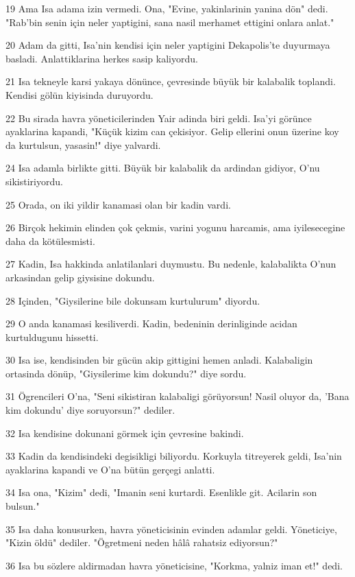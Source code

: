 \par 19 Ama Isa adama izin vermedi. Ona, "Evine, yakinlarinin yanina dön" dedi. "Rab'bin senin için neler yaptigini, sana nasil merhamet ettigini onlara anlat."
\par 20 Adam da gitti, Isa'nin kendisi için neler yaptigini Dekapolis'te duyurmaya basladi. Anlattiklarina herkes sasip kaliyordu.
\par 21 Isa tekneyle karsi yakaya dönünce, çevresinde büyük bir kalabalik toplandi. Kendisi gölün kiyisinda duruyordu.
\par 22 Bu sirada havra yöneticilerinden Yair adinda biri geldi. Isa'yi görünce ayaklarina kapandi, "Küçük kizim can çekisiyor. Gelip ellerini onun üzerine koy da kurtulsun, yasasin!" diye yalvardi.
\par 24 Isa adamla birlikte gitti. Büyük bir kalabalik da ardindan gidiyor, O'nu sikistiriyordu.
\par 25 Orada, on iki yildir kanamasi olan bir kadin vardi.
\par 26 Birçok hekimin elinden çok çekmis, varini yogunu harcamis, ama iyilesecegine daha da kötülesmisti.
\par 27 Kadin, Isa hakkinda anlatilanlari duymustu. Bu nedenle, kalabalikta O'nun arkasindan gelip giysisine dokundu.
\par 28 Içinden, "Giysilerine bile dokunsam kurtulurum" diyordu.
\par 29 O anda kanamasi kesiliverdi. Kadin, bedeninin derinliginde acidan kurtuldugunu hissetti.
\par 30 Isa ise, kendisinden bir gücün akip gittigini hemen anladi. Kalabaligin ortasinda dönüp, "Giysilerime kim dokundu?" diye sordu.
\par 31 Ögrencileri O'na, "Seni sikistiran kalabaligi görüyorsun! Nasil oluyor da, 'Bana kim dokundu' diye soruyorsun?" dediler.
\par 32 Isa kendisine dokunani görmek için çevresine bakindi.
\par 33 Kadin da kendisindeki degisikligi biliyordu. Korkuyla titreyerek geldi, Isa'nin ayaklarina kapandi ve O'na bütün gerçegi anlatti.
\par 34 Isa ona, "Kizim" dedi, "Imanin seni kurtardi. Esenlikle git. Acilarin son bulsun."
\par 35 Isa daha konusurken, havra yöneticisinin evinden adamlar geldi. Yöneticiye, "Kizin öldü" dediler. "Ögretmeni neden hâlâ rahatsiz ediyorsun?"
\par 36 Isa bu sözlere aldirmadan havra yöneticisine, "Korkma, yalniz iman et!" dedi.
